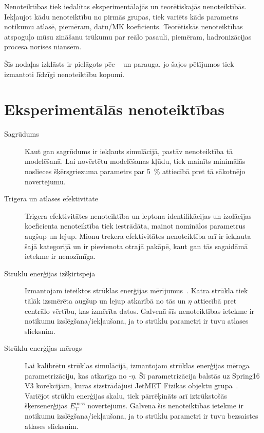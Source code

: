 Nenoteiktības tiek iedalītas eksperimentālajās un teorētiskajās nenoteiktībās. Iekļaujot kādu nenoteiktību no pirmās grupas, tiek variēts kāds parametrs notikumu atlasē, piemēram, datu/MK koeficients. Teorētiskās nenoteiktības atspoguļo mūsu zināšanu trūkumu par reālo pasauli, piemēram, hadronizācijas procesa norises niansēm. 

Šīs nodaļas izklāsts ir pielāgots pēc ~\cite{CMS-AN-2017-175} un \cite{CMS-AN-2017-159} parauga, jo šajos pētījumos tiek izmantoti līdzīgi nenoteiktību kopumi.

\section{Eksperimentālās nenoteiktības}
\begin{description}
\item[Sagrūdums] Kaut gan sagrūdums ir iekļauts simulācijā, pastāv nenoteiktība tā modelēšanā. Lai novērtētu modelēšanas kļūdu, tiek mainīts minimālās noslieces šķērsgriezuma parametrs par 5~\% attiecībā pret tā sākotnējo novērtējumu. 

\item[Trigera un atlases efektivitāte] Trigera efektivitātes nenoteiktība un leptona identifikācijas un izolācijas koeficienta nenoteiktība tiek iestrādāta, mainot nominālos parametrus augšup un lejup. Mionu trekera efektivitātes nenoteiktība arī ir iekļauta šajā kategorijā un ir pievienota otrajā pakāpē, kaut gan tās sagaidāmā ietekme ir nenozīmīga. 

\item[Strūklu enerģijas izšķirtspēja] Izmantojam ieteiktos strūklas enerģijas mērījumus~\cite{twiki:JER}. Katra strūkla tiek tālāk izsmērēta augšup un lejup atkarībā no tās \pt un $\eta$ attiecībā pret centrālo vērtību, kas izmērīta datos. Galvenā šīs nenoteiktības ietekme ir notikumu izslēgšana/iekļaušana, ja to strūklu parametri ir tuvu atlases slieksnim. 

\item[Strūklu enerģijas mērogs] Lai kalibrētu strūklas simulācijā, izmantojam strūklas enerģijas mēroga parametrizāciju, kas atkarīga no \pt-$\eta$. Šī parametrizācija balstās uz Spring16 V3 korekcijām, kuras sizstrādājusi JetMET Fizikas objektu grupa~\cite{twiki:JES}. Variējot strūklu enerģijas skalu, tiek pārrēķināts arī iztrūkstošās šķērsenerģijas $E^{\text{miss}}_{T}$ novērtējums. Galvenā šīs nenoteiktības ietekme ir notikumu izslēgšana/iekļaušana, ja to strūklu parametri ir tuvu bezsaistes atlases slieksnim. 


\end{description}
